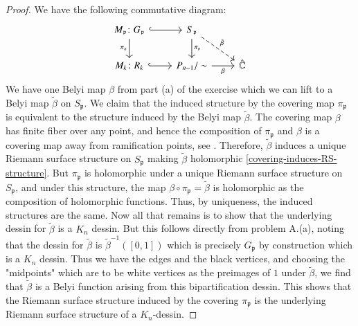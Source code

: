 \documentclass[reqno]{amsart}
\theoremstyle{definition}
\theoremstyle{remark}
\begin{document}
\begin{proof}
        We have the following commutative diagram:
        \begin{equation*}
            \begin{tikzcd}
                M_{\mathfrak{p}} \colon G_{\mathfrak{p}} \ar[r, hookrightarrow] \ar[d, "\pi_{\mathfrak{p}}"'] & S_{\mathfrak{p}} \ar[d, "\pi_{\mathfrak{p}}"] \ar[rd, dashed, "
                \tilde{\beta}"]  &\\
                M_k \colon R_k \ar[r, hookrightarrow] & P_{n-1}/\sim \ar[r, "\beta"'] & \hat{\mathbb{C}}
            \end{tikzcd}
        \end{equation*}
        We have one Belyi map
        $\beta$
        from part (a) of the exercise which
        we can lift to a Belyi map $\tilde{\beta}$ on
        $S_{\mathfrak{p}}$. 
        We claim that the
        induced structure by
        the covering map $\pi_{\mathfrak{p}}$
        is equivalent to the
        structure induced by the Belyi map
         $\tilde{\beta}$. The covering map
         $\beta$ has finite fiber over any point, and
         hence the composition of $\pi_{\mathfrak{p}}$
         and $\beta$ is a covering map away from
         ramification points, see \cite[Exercise 53.4]{Munkres}. Therefore, $\tilde{\beta}$
         induces a unique Riemann surface structure
         on $S_{\mathfrak{p}}$ making $\tilde{\beta}$
         holomorphic \ref{covering-induces-RS-structure}. But $\pi_{\mathfrak{p}}$ is
         holomorphic under a unique Riemann surface structure on $S_{\mathfrak{p}}$, and under this
         structure, the map $\beta \circ \pi_{\mathfrak{p}} = \tilde{\beta}$ is holomorphic as the composition of holomorphic functions. Thus, by uniqueness, the induced
         structures are the same. Now all that
         remains is to show that the underlying dessin
         for $\tilde{\beta}$ is a $K_n$ dessin. But
         this follows directly from
         problem A.(a), noting that the dessin
         for $\tilde{\beta}$ is
         $\tilde{\beta}^{-1}([0,1])$ which is
         precisely $G_{\mathfrak{p}}$ by construction
         which is a $K_n$ dessin. Thus we have
         the edges and the black vertices, and choosing
         the "midpoints" which are to be white vertices
         as the preimages of $1$ under $\tilde{\beta}$,
         we find that $\tilde{\beta}$ is a Belyi
         function arising from this bipartification dessin.
         This shows that the Riemann surface
         structure induced by the covering 
         $\pi_{\mathfrak{p}}$ is the underlying Riemann
         surface structure of a $K_n$-dessin.


\end{proof}
\end{document}
